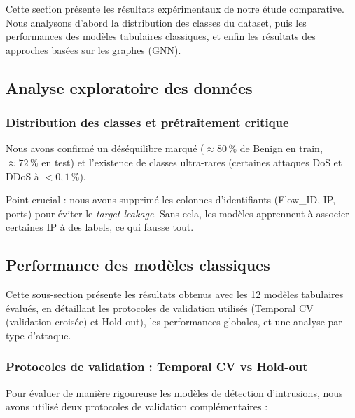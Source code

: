 ﻿\documentclass[11pt,a4paper]{article}
\begin{document}
Cette section présente les résultats expérimentaux de notre étude comparative. Nous analysons d'abord la distribution des classes du dataset, puis les performances des modèles tabulaires classiques, et enfin les résultats des approches basées sur les graphes (GNN).

\subsection{Analyse exploratoire des données}

\subsubsection{Distribution des classes et prétraitement critique}

Nous avons confirmé un déséquilibre marqué ($\approx 80\,\%$ de Benign en train, $\approx 72\,\%$ en test) et l'existence de classes ultra-rares (certaines attaques DoS et DDoS à $<0{,}1\,\%$).

Point crucial : nous avons supprimé les colonnes d'identifiants (Flow\_ID, IP, ports) pour éviter le \emph{target leakage}. Sans cela, les modèles apprennent à associer certaines IP à des labels, ce qui fausse tout.

\subsection{Performance des modèles classiques}

Cette sous-section présente les résultats obtenus avec les 12 modèles tabulaires évalués, en détaillant les protocoles de validation utilisés (Temporal CV (validation croisée) et Hold-out), les performances globales, et une analyse par type d'attaque.

\subsubsection{Protocoles de validation : Temporal CV vs Hold-out}

Pour évaluer de manière rigoureuse les modèles de détection d'intrusions, nous avons utilisé deux protocoles de validation complémentaires :
\end{document}
